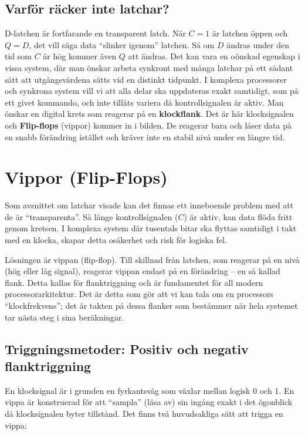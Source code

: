\documentclass[
  swedish,
  letterpaper,
  oneside,
  openany]{book}
\begin{document}
\subsection{Varför räcker inte
latchar?}\label{varfuxf6r-ruxe4cker-inte-latchar}

D-latchen är fortfarande en transparent latch. När \(C = 1\) är latchen
öppen och \(Q = D\), det vill säga data ``slinker igenom'' latchen. Så
om \(D\) ändras under den tid som \(C\) är hög kommer även \(Q\) att
ändras. Det kan vara en oönskad egenskap i vissa system, där man önskar
arbeta synkront med många latchar på ett sådant sätt att utgångsvärdena
sätts vid en distinkt tidpunkt. I komplexa processorer och synkrona
system vill vi att alla delar ska uppdateras exakt samtidigt, som på ett
givet kommando, och inte tillåts variera då kontrollsignalen är aktiv.
Man önskar en digital krets som reagerar på en \textbf{klockflank}. Det
är här klocksignalen och \textbf{Flip-flops} (vippor) kommer in i
bilden. De reagerar bara och låser data på en snabb förändring istället
och kräver inte en stabil nivå under en längre tid.

\section{Vippor (Flip-Flops)}\label{sec-vippor}

Som avsnittet om latchar visade kan det finnas ett inneboende problem
med att de är ``transparenta''. Så länge kontrollsignalen (\(C\)) är
aktiv, kan data flöda fritt genom kretsen. I komplexa system där
tusentals bitar ska flyttas samtidigt i takt med en klocka, skapar detta
osäkerhet och risk för logiska fel.

Lösningen är vippan (flip-flop). Till skillnad från latchen, som
reagerar på en nivå (hög eller låg signal), reagerar vippan endast på en
förändring -- en så kallad flank. Detta kallas för flanktriggning och är
fundamentet för all modern processorarkitektur. Det är detta som gör att
vi kan tala om en processors ``klockfrekvens''; det är takten på dessa
flanker som bestämmer när hela systemet tar nästa steg i sina
beräkningar.

\subsection{Triggningsmetoder: Positiv och negativ
flanktriggning}\label{triggningsmetoder-positiv-och-negativ-flanktriggning}

En klocksignal är i grunden en fyrkantsvåg som växlar mellan logisk 0
och 1. En vippa är konstruerad för att ``sampla'' (läsa av) sin ingång
exakt i det ögonblick då klocksignalen byter tillstånd. Det finns två
huvudsakliga sätt att trigga en vippa:
\end{document}
